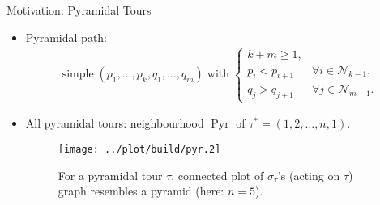 \documentclass[
  size=8pt,
  style=klope,
  paper=screen,
  pauseslide,
  nopagebreaks,
  hlsections,
  fleqn
]{powerdot}
\def\eqitspace{\vspace{-5mm}}
\begin{document}
\begin{slide}[toc=Pyramidal Tours]{Motivation: Pyramidal Tours}
\begin{itemize}
  \item
  Pyramidal path:
  \begin{align}
  \text{simple} \; \left( p_1, \ldots, p_k, q_1, \ldots, q_m \right) \; \text{with} \;
  \begin{cases}
  k+m \geq 1, & \\
  p_i < p_{i+1} \; & \forall i \in \mathcal{N}_{k-1},\\
  q_j > q_{j+1} \; & \forall j \in \mathcal{N}_{m-1}.
  \end{cases}
  \end{align}
  \item
  All pyramidal tours: neighbourhood $\operatorname{Pyr}$ %
  of %
  $\tau^\ast = \left(1, 2, \ldots, n, 1\right)$.
  \begin{figure}[H]
    \centering
    \texttt{[image: ../plot/build/pyr.2]}
    \caption{%
      For a pyramidal tour $\tau$,
      connected plot of $\sigma_\tau$'s
      (acting on $\tau$)
      graph resembles a pyramid (here: $n = 5$).
    }
  \end{figure}
\end{itemize}
\end{slide}
\end{document}
